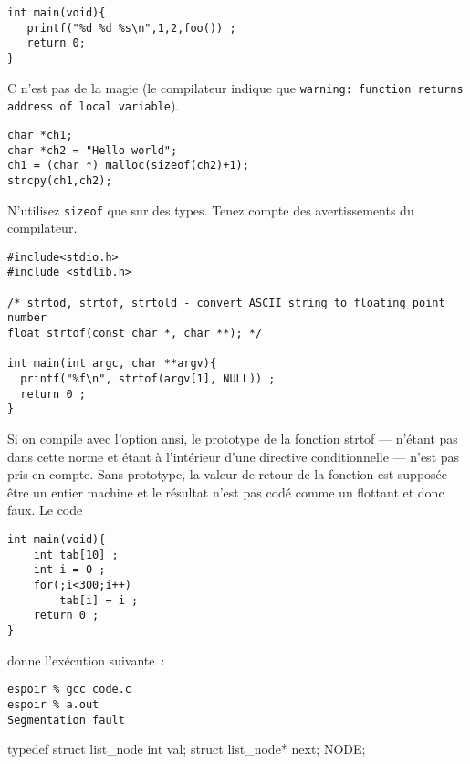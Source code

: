 \begin{frame}
\begin{verbatim}
int main(void){
   printf("%d %d %s\n",1,2,foo()) ;
   return 0;
}
\end{verbatim}
C n'est pas de la magie (le compilateur indique que 
\verb+warning: function returns address of local variable+).
\begin{verbatim}
char *ch1;
char *ch2 = "Hello world";
ch1 = (char *) malloc(sizeof(ch2)+1); 
strcpy(ch1,ch2);
\end{verbatim}
N'utilisez \verb?sizeof? que sur des types.
\newpage
Tenez compte des avertissements du compilateur.
\begin{verbatim}
#include<stdio.h>
#include <stdlib.h>
 
/* strtod, strtof, strtold - convert ASCII string to floating point number
float strtof(const char *, char **); */

int main(int argc, char **argv){
  printf("%f\n", strtof(argv[1], NULL)) ;  
  return 0 ;
}
\end{verbatim}
Si on compile avec l'option ansi, le prototype de la fonction strtof
--- n'\'etant pas dans cette norme et \'etant \`a l'int\'erieur d'une
directive conditionnelle --- n'est pas pris en compte.  Sans
prototype, la valeur de retour de la fonction est suppos\'ee \^etre un
entier machine et le r\'esultat n'est pas cod\'e comme un flottant et
donc faux.
\newpage
Le code
\begin{verbatim}
int main(void){
    int tab[10] ;
    int i = 0 ;
    for(;i<300;i++) 
        tab[i] = i ;
    return 0 ;
}
\end{verbatim}
donne l'ex\'ecution suivante~:
\begin{verbatim}
espoir % gcc code.c 
espoir % a.out
Segmentation fault
\end{verbatim}
\end{frame}

\begin{frame}
\printindex
\end{frame}
\begin{frame}
  \frameheading{}%
\end{frame}

typedef struct list_node
{
        int val;
        struct list_node* next;
} NODE;


